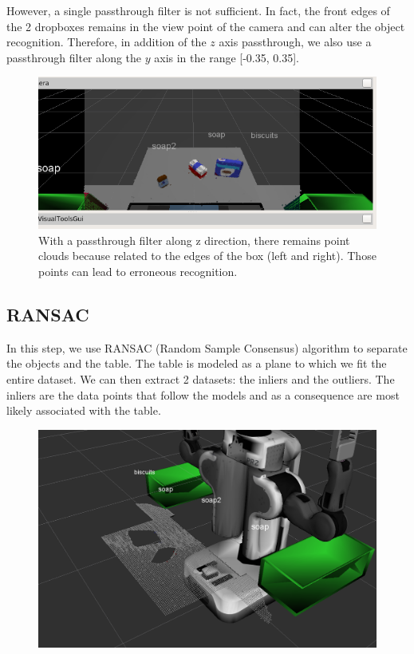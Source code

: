 \documentclass[a4paper,12pt]{report}
\begin{document}
\linespread{0.5}


However, a single passthrough filter is not sufficient. In fact, the front edges of the 2 dropboxes remains in the view point of the camera and can alter the object recognition. Therefore, in addition of the $z$ axis passthrough, we also use a passthrough filter along the $y$ axis in the range [-0.35, 0.35].

\begin{figure}[H]
\centering
        \includegraphics[totalheight=9cm]{imgs/p_z_passthrough.png}
        \caption{With a passthrough filter along z direction, there remains point clouds because related to the edges of the box (left and right). Those points can lead to erroneous recognition.}
\end{figure}

\linespread{1.3}


\subsection{RANSAC}
In this step, we use RANSAC (Random Sample Consensus) algorithm to separate the objects and the table. The table is modeled as a plane to which we fit the entire  dataset. We can then extract 2 datasets: the inliers and the outliers. The inliers are the data points that follow the models and as a consequence are most likely associated with the table.

\begin{figure}[H]
\centering
        \includegraphics[totalheight=9cm]{imgs/ransac.png}
\end{figure}
\end{document}
